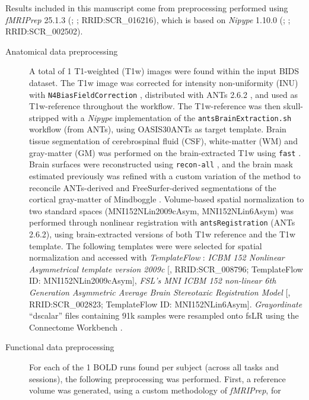 \documentclass[
]{article}
\author{}
\date{}
\begin{document}
Results included in this manuscript come from preprocessing performed
using \emph{fMRIPrep} 25.1.3 (\citet{fmriprep1}; \citet{fmriprep2};
RRID:SCR\_016216), which is based on \emph{Nipype} 1.10.0
(\citet{nipype1}; \citet{nipype2}; RRID:SCR\_002502).

\begin{description}
\item[Anatomical data preprocessing]
A total of 1 T1-weighted (T1w) images were found within the input BIDS
dataset. The T1w image was corrected for intensity non-uniformity (INU)
with \texttt{N4BiasFieldCorrection} \citep{n4}, distributed with ANTs
2.6.2 \citep[RRID:SCR\_004757]{ants}, and used as T1w-reference
throughout the workflow. The T1w-reference was then skull-stripped with
a \emph{Nipype} implementation of the \texttt{antsBrainExtraction.sh}
workflow (from ANTs), using OASIS30ANTs as target template. Brain tissue
segmentation of cerebrospinal fluid (CSF), white-matter (WM) and
gray-matter (GM) was performed on the brain-extracted T1w using
\texttt{fast} \citep[FSL (version unknown),
RRID:SCR\_002823,][]{fsl_fast}. Brain surfaces were reconstructed using
\texttt{recon-all} \citep[FreeSurfer 7.3.2,
RRID:SCR\_001847,][]{fs_reconall}, and the brain mask estimated
previously was refined with a custom variation of the method to
reconcile ANTs-derived and FreeSurfer-derived segmentations of the
cortical gray-matter of Mindboggle
\citep[RRID:SCR\_002438,][]{mindboggle}. Volume-based spatial
normalization to two standard spaces (MNI152NLin2009cAsym,
MNI152NLin6Asym) was performed through nonlinear registration with
\texttt{antsRegistration} (ANTs 2.6.2), using brain-extracted versions
of both T1w reference and the T1w template. The following templates were
were selected for spatial normalization and accessed with
\emph{TemplateFlow} \citep[24.2.2,][]{templateflow}: \emph{ICBM 152
Nonlinear Asymmetrical template version 2009c}
{[}\citet{mni152nlin2009casym}, RRID:SCR\_008796; TemplateFlow ID:
MNI152NLin2009cAsym{]}, \emph{FSL's MNI ICBM 152 non-linear 6th
Generation Asymmetric Average Brain Stereotaxic Registration Model}
{[}\citet{mni152nlin6asym}, RRID:SCR\_002823; TemplateFlow ID:
MNI152NLin6Asym{]}. \emph{Grayordinate} ``dscalar'' files containing 91k
samples were resampled onto fsLR using the Connectome Workbench
\citep{hcppipelines}.
\item[Functional data preprocessing]
For each of the 1 BOLD runs found per subject (across all tasks and
sessions), the following preprocessing was performed. First, a reference
volume was generated, using a custom methodology of \emph{fMRIPrep}, for

\end{description}
\end{document}

